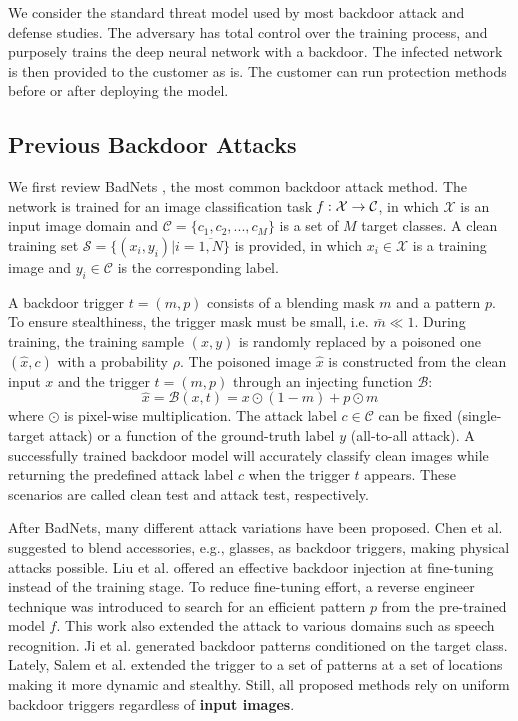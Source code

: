 We consider the standard threat model used by most backdoor attack and defense studies. The adversary has total control over the training process, and purposely trains the deep neural network with a backdoor. The infected network is then provided to the customer as is. The customer can run protection methods before or after deploying the model.

\subsection{Previous Backdoor Attacks}
We first review BadNets \cite{gu2017badnets}, the most common backdoor attack method. The network is trained for an image classification task $\it{f}:\mathcal{X} \rightarrow \mathcal{C}$, in which $\mathcal{X}$ is an input image domain and $\mathcal{C} = \{c_1, c_2, ..., c_M\}$ is a set of $M$ target classes. A clean training set $\mathcal{S} = \{(x_i, y_i) | i=\overline{1,N}\}$ is provided, in which $x_i \in \mathcal{X}$ is a training image and $y_i \in \mathcal{C}$ is the corresponding label.

A backdoor trigger $t = (m, p)$ consists of a blending mask $m$ and a pattern $p$. To ensure stealthiness, the trigger mask must be small, i.e. $\bar{m} \ll 1$. During training, the training sample $(x,y)$ is randomly replaced by a poisoned one $(\hat{x},c)$ with a probability $\rho$. The poisoned image $\hat{x}$ is constructed from the clean input $x$ and the trigger $t = (m, p)$ through an injecting function $\mathcal{B}$:
\begin{equation}
\hat{x} = \mathcal{B}(x,t) = x \odot (1-m) + p \odot m 
\label{eq:backdoor}
\end{equation}
where $\odot$ is pixel-wise multiplication. The attack label $c \in \mathcal{C}$ can be fixed (single-target attack) or a function of the ground-truth label $y$ (all-to-all attack). 
A successfully trained backdoor model will accurately classify clean images while returning the predefined attack label $c$ when the trigger $t$ appears. These scenarios are called clean test and attack test, respectively.

After BadNets, many different attack variations have been proposed. Chen et al. \cite{chen2017targeted} suggested to blend accessories, e.g., glasses, as backdoor triggers, making physical attacks possible. Liu et al. \cite{liu2017trojaning} offered an effective backdoor injection at fine-tuning instead of the training stage. To reduce fine-tuning effort, a reverse engineer technique was introduced to search for an efficient pattern $p$ from the pre-trained model $f$. This work also extended the attack to various domains such as speech recognition. Ji et al. \cite{ji2019programmable} generated backdoor patterns conditioned on the target class. Lately, Salem et al. \cite{salem2020dynamic} extended the trigger to a set of patterns at a set of locations making it more dynamic and stealthy. Still, all proposed methods rely on uniform backdoor triggers regardless of \textbf{input images}.

